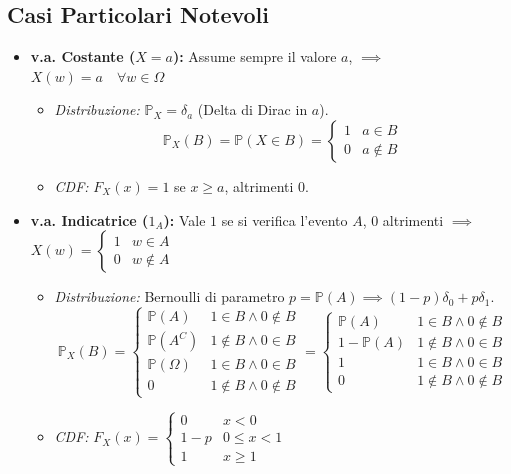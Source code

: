 \documentclass[12pt]{extarticle} %
\begin{document}
\subsection{Casi Particolari Notevoli}
\begin{itemize}
    \item \textbf{v.a. Costante ($X = a$):} Assume sempre il valore $a$, $\implies$ $X(w)=a \hspace{1em}\forall w\in \Omega$
    \begin{itemize}
        \item \textit{Distribuzione:} $\mathbb{P}_X = \delta_a$ (Delta di Dirac in $a$).
        $$
        \mathbb{P}_X(B) = \mathbb{P}(X \in B) = \begin{cases}
            1 & a\in B \\
            0 & a \notin B
        \end{cases}
        $$
        
        \item \textit{CDF:} $F_X(x) = 1$ se $x \ge a$, altrimenti $0$.
    \end{itemize}
    \item \textbf{v.a. Indicatrice ($1_A$):} Vale $1$ se si verifica l'evento $A$, $0$ altrimenti $\implies$ $X(w) = \begin{cases}
        1 & w\in A \\ 0 & w\notin A
    \end{cases}$
    \begin{itemize}
        \item \textit{Distribuzione:} Bernoulli di parametro $p = \mathbb{P}(A) \implies (1-p)\delta_0 + p\delta_1$.
        $$
        \mathbb{P}_X(B) = \begin{cases}
            \mathbb{P}(A) & 1\in B \land 0\notin B \\
            \mathbb{P}(A^C) & 1\notin B \land 0\in B \\
            \mathbb{P}(\Omega) & 1\in B \land 0 \in B \\
            0 & 1\notin B  \land 0 \notin B
        \end{cases}
        =
        \begin{cases}
            \mathbb{P}(A) & 1\in B \land 0\notin B \\
            1-\mathbb{P}(A) & 1\notin B \land 0\in B \\
            1 & 1\in B \land 0 \in B \\
            0 & 1\notin B  \land 0 \notin B
        \end{cases}
        $$
        
        \item \textit{CDF:} 
        $F_X(x) = \begin{cases} 0 & x < 0 \\ 1-p & 0 \le x < 1 \\ 1 & x \ge 1 \end{cases}$
    \end{itemize}
\end{itemize}
\end{document}
